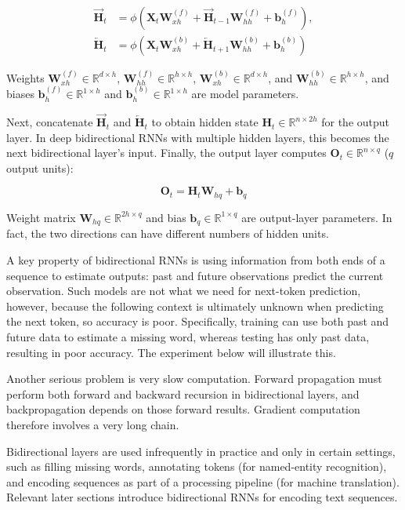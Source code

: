 \[
\begin{aligned}
\overrightarrow{\mathbf{H}}_t &= \phi(\mathbf{X}_t\mathbf{W}_{xh}^{(f)} + \overrightarrow{\mathbf{H}}_{t-1}\mathbf{W}_{hh}^{(f)} + \mathbf{b}_h^{(f)}), \\
\overleftarrow{\mathbf{H}}_t &= \phi(\mathbf{X}_t\mathbf{W}_{xh}^{(b)} + \overleftarrow{\mathbf{H}}_{t+1}\mathbf{W}_{hh}^{(b)} + \mathbf{b}_h^{(b)})
\end{aligned}
\]

Weights \(\mathbf{W}_{xh}^{(f)} \in \mathbb{R}^{d \times h}\), \(\mathbf{W}_{hh}^{(f)} \in \mathbb{R}^{h \times h}\), \(\mathbf{W}_{xh}^{(b)} \in \mathbb{R}^{d \times h}\), and \(\mathbf{W}_{hh}^{(b)} \in \mathbb{R}^{h \times h}\), and biases \(\mathbf{b}_h^{(f)} \in \mathbb{R}^{1 \times h}\) and \(\mathbf{b}_h^{(b)} \in \mathbb{R}^{1 \times h}\) are model parameters.

Next, concatenate \(\overrightarrow{\mathbf{H}}_t\) and \(\overleftarrow{\mathbf{H}}_t\) to obtain hidden state \(\mathbf{H}_t \in \mathbb{R}^{n \times 2h}\) for the output layer. In deep bidirectional RNNs with multiple hidden layers, this becomes the next bidirectional layer's input. Finally, the output layer computes \(\mathbf{O}_t \in \mathbb{R}^{n \times q}\) (\(q\) output units):

\[
\mathbf{O}_t = \mathbf{H}_t\mathbf{W}_{hq} + \mathbf{b}_q
\]

Weight matrix \(\mathbf{W}_{hq} \in \mathbb{R}^{2h \times q}\) and bias \(\mathbf{b}_q \in \mathbb{R}^{1 \times q}\) are output-layer parameters. In fact, the two directions can have different numbers of hidden units.

A key property of bidirectional RNNs is using information from both ends of a sequence to estimate outputs: past and future observations predict the current observation. Such models are not what we need for next-token prediction, however, because the following context is ultimately unknown when predicting the next token, so accuracy is poor. Specifically, training can use both past and future data to estimate a missing word, whereas testing has only past data, resulting in poor accuracy. The experiment below will illustrate this.

Another serious problem is very slow computation. Forward propagation must perform both forward and backward recursion in bidirectional layers, and backpropagation depends on those forward results. Gradient computation therefore involves a very long chain.

Bidirectional layers are used infrequently in practice and only in certain settings, such as filling missing words, annotating tokens (for named-entity recognition), and encoding sequences as part of a processing pipeline (for machine translation). Relevant later sections introduce bidirectional RNNs for encoding text sequences.

